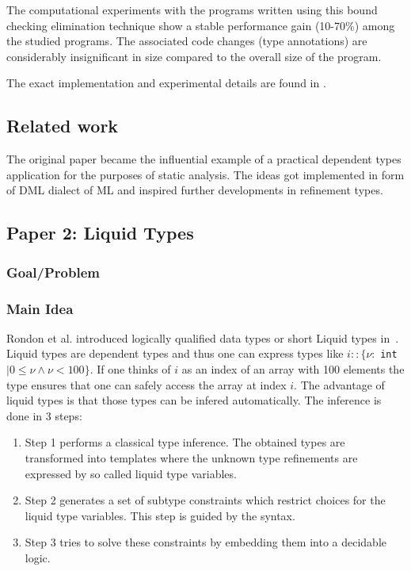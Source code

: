 \documentclass[a4paper,UKenglish]{lipics-v2016}
\begin{document}
The computational experiments with the programs written using this bound
checking elimination technique show a stable performance gain (10-70\%) among
the studied programs. The associated code changes (type annotations) are
considerably insignificant in size compared to the overall size of the program.

The exact implementation and experimental details are found in \cite{Xi:1998}.

\subsection{Related work}

The original paper became the influential example of a practical dependent
types application for the purposes of static analysis. The ideas got
implemented in form of DML dialect of ML \cite{XiPhd:1998} and inspired further
developments in refinement types.


\subsection{Paper 2: Liquid Types}

\subsubsection{Goal/Problem}

\subsubsection{Main Idea}

Rondon et al. introduced logically qualified data types or short Liquid types in~\cite{Rondon:2008:LT}.
Liquid types are dependent types and thus one can express types like $i:: \{\nu:$ \lstinline{int} $\mid 0 \le \nu \land \nu < 100\}$.
If one thinks of $i$ as an index of an array with 100 elements the type ensures that one can safely access the array at index $i$.
The advantage of liquid types is that those types can be infered automatically.
The inference is done in 3 steps:
\begin{enumerate}
    \item Step 1 performs a classical type inference.
        The obtained types are transformed into templates where the unknown type refinements are expressed by so called liquid type variables.
    \item Step 2 generates a set of subtype constraints which restrict choices for the liquid type variables.
        This step is guided by the syntax.
    \item Step 3 tries to solve these constraints by embedding them into a decidable logic.
\end{enumerate}
\end{document}
